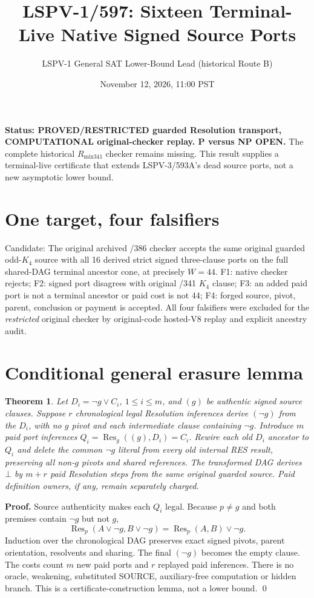 \documentclass[11pt]{article}
\title{LSPV-1/597: Sixteen Terminal-Live Native Signed Source Ports}
\author{LSPV-1 General SAT Lower-Bound Lead (historical Route B)}
\date{November 12, 2026, 11:00 PST}
\newtheorem{theorem}{Theorem}
\begin{document}
\maketitle
\noindent\textbf{Status: PROVED/RESTRICTED guarded Resolution transport,
COMPUTATIONAL original-checker replay. P versus NP OPEN.}
The complete historical $R_{\mathrm{mix341}}$ checker remains missing.
This result supplies a terminal-live certificate that extends
LSPV-3/593A's dead source ports, not a new asymptotic lower bound.

\section*{One target, four falsifiers}
Candidate: The original archived /386 checker accepts the same
original guarded odd-$K_4$ source with all 16 derived strict signed
three-clause ports on the full shared-DAG terminal ancestor cone,
at precisely $W=44$. F1: native checker rejects; F2: signed
port disagrees with original /341 $K_4$ clause; F3: an added paid
port is not a terminal ancestor or paid cost is not 44; F4:
forged source, pivot, parent, conclusion or payment is accepted.
All four falsifiers were excluded for the \emph{restricted} original
checker by original-code hosted-V8 replay and explicit ancestry audit.

\section*{Conditional general erasure lemma}
\begin{theorem}
Let $D_i=\neg g\lor C_i$, $1\le i\le m$, and $(g)$ be
authentic signed source clauses. Suppose $r$ chronological legal
Resolution inferences derive $(\neg g)$ from the $D_i$,
with no $g$ pivot and each intermediate clause containing
$\neg g$. Introduce $m$ paid port inferences
$Q_i=\operatorname{Res}_{g}((g),D_i)=C_i$.
Rewire each old $D_i$ ancestor to $Q_i$ and delete
the common $\neg g$ literal from every old internal
RES result, preserving all non-$g$ pivots and shared references.
The transformed DAG derives $\bot$ by $m+r$ paid
Resolution steps from the \emph{same original guarded source}.
Paid definition owners, if any, remain separately charged.
\end{theorem}
\noindent\textbf{Proof.} Source authenticity makes each
$Q_i$ legal. Because $p\ne g$ and both premises contain
$\neg g$ but not $g$,
\[
\operatorname{Res}_p(A\vee\neg g,B\vee\neg g)
=\operatorname{Res}_p(A,B)\vee\neg g.
\]
Induction over the chronological DAG preserves exact
signed pivots, parent orientation, resolvents and sharing.
The final $(\neg g)$ becomes the empty clause.
The costs count $m$ new paid ports and $r$ replayed paid
inferences. There is no oracle, weakening, substituted
SOURCE, auxiliary-free computation or hidden branch.
This is a certificate-construction lemma, not a lower bound. \qed
\end{document}

